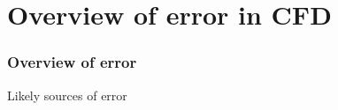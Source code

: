 \documentclass{beamer}
\begin{document}


\section[Error]{Overview of error in CFD}
\begin{frame}%
\frametitle{Overview of error}
\vspace{0pt}
\begin{minipage}[t][1.1\textheight]{1\textwidth}
\scriptsize
\vspace{-20pt}
\begin{exampleblock}{Likely sources of error}
\vspace{-20pt}
\begin{figure}[h!]
\end{figure}
\end{exampleblock}
\end{minipage}
\end{frame}
\end{document}

